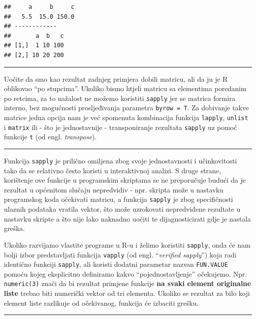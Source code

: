 \documentclass[]{book}
\theoremstyle{definition}
\theoremstyle{definition}
\theoremstyle{definition}
\theoremstyle{remark}
\begin{document}
\begin{verbatim}
##     a     b     c 
##   5.5  15.0 150.0 
## ------------
##       a  b   c
## [1,]  1 10 100
## [2,] 10 20 200
\end{verbatim}

\begin{center}\rule{0.5\linewidth}{\linethickness}\end{center}

Uočite da smo kao rezultat zadnjeg primjera dobili matricu, ali da ju je
R oblikovao ``po stupcima''. Ukoliko bismo htjeli matricu sa elementima
poredanim po retcima, za to nažalost ne možemo koristiti \texttt{sapply}
jer se matrica formira interno, bez mogućnosti prosljeđivanja parametra
\texttt{byrow\ =\ T}. Za dobivanje takve matrice jedna opcija nam je već
spomenuta kombinacija funkcija \texttt{lapply}, \texttt{unlist} i
\texttt{matrix} ili - što je jednostavnije - transponiranje rezultata
\texttt{sapply} uz pomoć funkcije \texttt{t} (od engl.
\emph{transpose}).

\begin{center}\rule{0.5\linewidth}{\linethickness}\end{center}

Funkcija \texttt{sapply} je prilično omiljena zbog svoje jednostavnosti
i učinkovitosti tako da se relativno često koristi u interaktivnoj
analizi. S druge strane, korištenje ove funkcije u programskim skriptama
se ne preporučuje budući da je rezultat u općenitom slučaju nepredvidiv
- npr. skripta može u nastavku programskog koda očekivati matricu, a
funkcija \texttt{sapply} je zbog specifičnosti ulaznih podataka vratila
vektor, što može uzrokovati nepredviđene rezultate u nastavku skripte a
što nije lako naknadno uočiti te dijagnosticirati gdje je nastala
greška.

Ukoliko razvijamo vlastite programe u R-u i želimo koristiti
\texttt{sapply}, onda će nam bolji izbor predstavljati funkcija
\texttt{vapply} (od engl. ``\emph{verified sapply}'') koja radi
identično funkciji \texttt{sapply}, ali koristi dodatni parametar nazvan
\texttt{FUN.VALUE} pomoću kojeg eksplicitno definiramo kakvo
``pojednostavljenje'' očekujemo. Npr. \texttt{numeric(3)} znači da bi
rezultat primjene funkcije \textbf{na svaki element originalne liste}
trebao biti numerički vektor od tri elementa. Ukoliko se rezultat za
bilo koji element liste razlikuje od očekivanog, funkcija će izbaciti
grešku.

\begin{center}\rule{0.5\linewidth}{\linethickness}\end{center}
\end{document}
